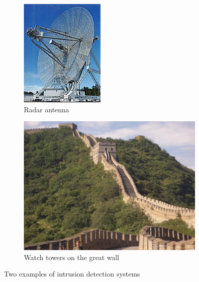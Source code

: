 \begin{figure}[ht]
    \centering 
    \begin{subfigure}[b]{0.281\textwidth} 
        \includegraphics[width=\textwidth]{figures/Radar_antenna.jpg} 
        \caption{Radar antenna} 
        \label{fig:intro-radar} 
    \end{subfigure} 
    \begin{subfigure}[b]{0.48\textwidth} 
        \includegraphics[width=\textwidth]{figures/great_wall.jpg} 
        \caption{Watch towers on the great wall} 
        \label{fig:intro-great_wall} 
    \end{subfigure}
    \caption{Two examples of intrusion detection systems}
    \label{fig:intro-IDS}
\end{figure} 

